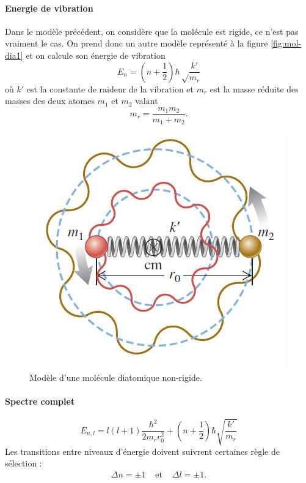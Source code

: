 \paragraph{Energie de vibration}
Dans le modèle précédent, on considère que la molécule est
rigide, ce n'est pas vraiment le cas. On prend donc un autre modèle
représenté à la figure \ref{fig:mol-dia1} et on calcule
son énergie de vibration
\[ E_n = \left(n + \frac{1}{2}\right)\hbar\sqrt\frac{k'}{m_r} \]
où $k'$ est la constante de raideur de la vibration et
$m_r$ est la masse réduite des masses des deux atomes $m_1$ et $m_2$ valant
\[ m_r = \frac{m_1m_2}{m_1+m_2}. \]

\begin{figure}[ht]
	\centering
	\includegraphics[scale=0.7]{img/mol-dia2.jpg}
	\caption{Modèle d'une molécule diatomique non-rigide.}
	\label{fig:mol-dia2}
\end{figure}

\paragraph{Spectre complet}
\[ E_{n,l} = l(l+1)\frac{\hbar^2}{2m_rr_0^2} + (n+\frac{1}{2})\hbar\sqrt{\frac{k'}{m_r}} \]
Les transitions entre niveaux d'énergie doivent suivrent certaines
règle de sélection :
\begin{align*}
	\Delta n = \pm 1 & \text{ et } & \Delta l = \pm 1.
\end{align*}

